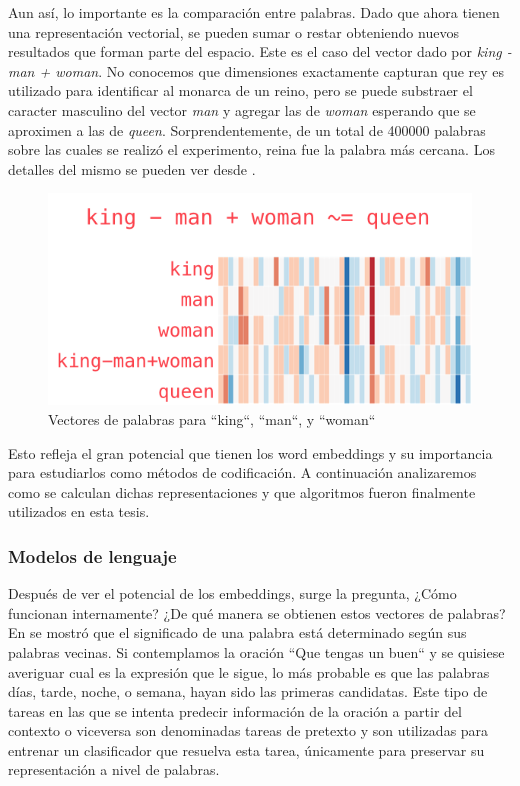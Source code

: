 Aun así, lo importante es la comparación entre palabras. Dado que ahora tienen
una representación vectorial, se pueden sumar o restar obteniendo nuevos
resultados que forman parte del espacio. Este es el caso del vector dado por
\emph{king - man + woman}. No conocemos que dimensiones exactamente capturan que
rey es utilizado para identificar al monarca de un reino, pero se puede
substraer el caracter masculino del vector \emph{man} y agregar las de
\emph{woman} esperando que se aproximen a las de \emph{queen}.
Sorprendentemente, de un total de 400000 palabras sobre las cuales se realizó el
experimento, reina fue la palabra más cercana. Los detalles del mismo se pueden
ver desde \citep{jalammar-website}.

\begin{figure}
    \centering
    \includegraphics[scale=0.68]{figures/king-analogy-viz.png}
    \caption{Vectores de palabras para ``king``, ``man``, y ``woman``}
    \label{fig:king-queen-example}
\end{figure}

Esto refleja el gran potencial que tienen los word embeddings y su importancia
para estudiarlos como métodos de codificación. A continuación analizaremos como
se calculan dichas representaciones y que algoritmos fueron finalmente
utilizados en esta tesis.

\subsubsection{Modelos de lenguaje}

Después de ver el potencial de los embeddings, surge la pregunta, ¿Cómo
funcionan internamente? ¿De qué manera se obtienen estos vectores de palabras?
En \citep{firth-57} se mostró que el significado de una palabra está determinado
según sus palabras vecinas. Si contemplamos la oración ``Que tengas un buen`` y
se quisiese averiguar cual es la expresión que le sigue, lo más probable es que
las palabras días, tarde, noche, o semana, hayan sido las primeras candidatas.
Este tipo de tareas en las que se intenta predecir información de la oración a
partir del contexto o viceversa son denominadas tareas de pretexto y son
utilizadas para entrenar un clasificador que resuelva esta tarea, únicamente
para preservar su representación a nivel de palabras.


